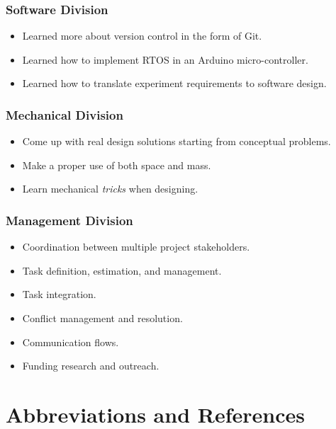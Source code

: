 \documentclass[a4paper,12pt,twoside]{article}
\begin{document}
\subsubsection{Software Division}

\begin{itemize}
    \item Learned more about version control in the form of Git.
    \item Learned how to implement RTOS in an Arduino micro-controller.
    \item Learned how to translate experiment requirements to software design.
\end{itemize}


\subsubsection{Mechanical Division}

\begin{itemize}
    \item Come up with real design solutions starting from conceptual problems.
    \item Make a proper use of both space and mass.
    \item Learn mechanical \textit{tricks} when designing. 

\end{itemize}


\subsubsection{Management Division}

\begin{itemize}
    \item Coordination between multiple project stakeholders.
    \item Task definition, estimation, and management.
    \item Task integration.
    \item Conflict management and resolution.
    \item Communication flows.
    \item Funding research and outreach.
\end{itemize}
\pagebreak
\section{Abbreviations and References}
\end{document}
